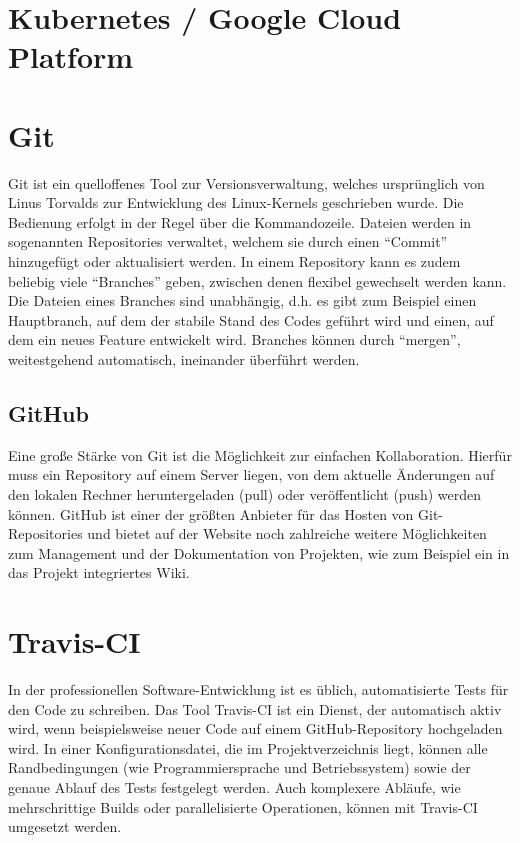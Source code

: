 \section{Kubernetes / Google Cloud Platform}

\section{Git}
Git ist ein quelloffenes Tool zur Versionsverwaltung, welches ursprünglich von Linus Torvalds zur Entwicklung des Linux-Kernels geschrieben wurde.
Die Bedienung erfolgt in der Regel über die Kommandozeile.
Dateien werden in sogenannten Repositories verwaltet, welchem sie durch einen \enquote{Commit} hinzugefügt oder aktualisiert werden.
In einem Repository kann es zudem beliebig viele \enquote{Branches} geben, zwischen denen flexibel gewechselt werden kann.
Die Dateien eines Branches sind unabhängig, d.h. es gibt zum Beispiel einen Hauptbranch, auf dem der stabile Stand des Codes geführt wird und einen, auf dem ein neues Feature entwickelt wird.
Branches können durch \enquote{mergen}, weitestgehend automatisch, ineinander überführt werden.
\subsection{GitHub}
Eine große Stärke von Git ist die Möglichkeit zur einfachen Kollaboration.
Hierfür muss ein Repository auf einem Server liegen, von dem aktuelle Änderungen auf den lokalen Rechner heruntergeladen (pull) oder veröffentlicht (push) werden können.
GitHub ist einer der größten Anbieter für das Hosten von Git-Repositories und bietet auf der Website noch zahlreiche weitere Möglichkeiten zum Management und der Dokumentation von Projekten, wie zum Beispiel ein in das Projekt integriertes Wiki.

\section{Travis-CI}
In der professionellen Software-Entwicklung ist es üblich, automatisierte Tests für den Code zu schreiben.
Das Tool Travis-CI ist ein Dienst, der automatisch aktiv wird, wenn beispielsweise neuer Code auf einem GitHub-Repository hochgeladen wird.
In einer Konfigurationsdatei, die im Projektverzeichnis liegt, können alle Randbedingungen (wie Programmiersprache und Betriebssystem) sowie der genaue Ablauf des Tests festgelegt werden.
Auch komplexere Abläufe, wie mehrschrittige Builds oder parallelisierte Operationen, können mit Travis-CI umgesetzt werden.

